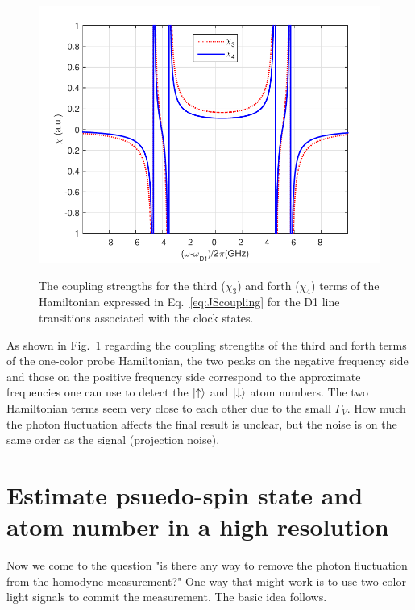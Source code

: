 \begin{figure}
\begin{minipage}{.91\linewidth}
\centering
{\includegraphics[scale=0.75]{../media/Figs/chi34}}
\end{minipage}
\caption[Coupling strengths as a function of detuning.]{The coupling strengths for the third ($ \chi_3 $) and forth ($ \chi_4 $) terms of the Hamiltonian expressed in Eq.~\eqref{eq:JScoupling} for the D1 line transitions associated with the clock states.} \label{fig:chi34}
\end{figure}

As shown in Fig.~\ref{fig:chi34} regarding the coupling strengths of the third and forth terms of the one-color probe Hamiltonian, the two peaks on the negative frequency side and those on the positive frequency side correspond to the approximate frequencies one can use to detect the $ \lvert{\uparrow}\rangle $ and $ \lvert{\downarrow}\rangle $ atom numbers. The two Hamiltonian terms seem very close to each other due to the small $ \Gamma_V $. How much the photon fluctuation affects the final result is unclear, but the noise is on the same order as the signal (projection noise).



\section{Estimate psuedo-spin state and atom number in a high resolution}
Now we come to the question "is there any way to remove the photon fluctuation from the homodyne measurement?" One way that might work is to use two-color light signals to commit the measurement. The basic idea follows. 

